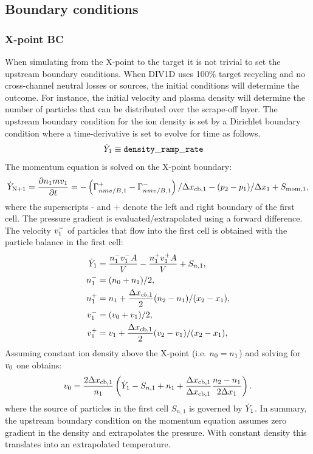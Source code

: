 \documentclass[amsmath,amssymb,a4]{revtex4-2}
\begin{document}
\subsection{Boundary conditions}

\subsubsection{X-point BC}
When simulating from the X-point to the target it is not trivial to set the upstream boundary conditions. When DIV1D uses 100\% target recycling and no cross-channel neutral losses or sources, the initial conditions will determine the outcome. For instance, the initial velocity and plasma density will determine the number of particles that can be distributed over the scrape-off layer. 
The upstream boundary condition for the ion density is set by a Dirichlet boundary condition where a time-derivative is set to evolve for time as follows. 
\begin{eqnarray}
     \dot{Y}_{\rm 1} & \equiv {\tt density\_ramp\_rate}  &
\end{eqnarray}
The momentum equation is solved on the X-point boundary:
\begin{equation}
   \dot{Y}_{\rm N+1} = \frac{\partial n_{\rm 1}mv_{\rm 1}}{\partial t} = - \left( \Gamma_{nmv/B,1}^+ -\Gamma_{nmv/B,1}^- \right)/\Delta x_{\rm cb,1} - (p_{\rm 2}-p_{\rm 1})/\Delta x_{\rm 1} + S_{\rm mom,1},
\end{equation}
where the superscripts - and + denote the left and right boundary of the first cell. The pressure gradient is evaluated/extrapolated using a forward difference. The velocity $v^{\rm -}_{\rm 1}$ of particles that flow into the first cell is obtained with the particle balance in the first cell:
\begin{eqnarray*}
\dot{Y}_1  &= \frac{n_{\rm 1}^{\rm -} v_{\rm 1}^{\rm -}A}{V} - \frac{n_{\rm 1}^{\rm +} v_{\rm 1}^{\rm +} A}{V} +   S_{n{\rm ,1}}, \\
    n_{\rm 1}^{\rm -} &= (n_{\rm 0} + n_{\rm 1})/2 ,\\
    n_{\rm 1}^{\rm +} &= n_{\rm 1} + \frac{\Delta x_{cb,1}}{2}(n_{\rm 2}-n_{\rm 1})/( x_{\rm 2} - x_{\rm 1}),\\
    v_{\rm 1}^{\rm -} &= (v_{\rm 0} + v_{\rm 1})/2,\\
    v_{\rm 1}^{\rm +} &= v_{\rm 1} + \frac{\Delta x_{\rm cb,1}}{2}(v_{\rm 2}-v_{\rm 1})/( x_{\rm 2} - x_{\rm 1}),
\end{eqnarray*}
Assuming constant ion density above the X-point (i.e. $n_{\rm 0} = n_{\rm 1}$) and solving for $v_{\rm 0}$ one obtains:
\begin{equation}
    v_{\rm 0} = \frac{2\Delta x_{\rm cb,1}}{n_{\rm 1}}\left(\dot{Y}_1 - S_{n{\rm,1}} + n_{\rm 1} + \frac{\Delta x_{\rm cb,1}}{\Delta x_{\rm cb,1}} \frac{n_{\rm 2} -n_{\rm 1}}{2\Delta x_{\rm 1}} \right).
\end{equation}
where the source of particles in the first cell $S_{n,1}$ is governed by $\dot{Y}_{\rm 1}$.
In summary, the upstream boundary condition on the momentum equation assumes zero gradient in the density and extrapolates the pressure. With constant density this translates into an extrapolated temperature.
\end{document}
